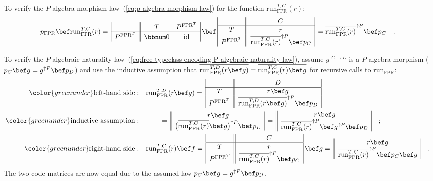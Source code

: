 To verify the $P$-algebra morphism law~(\ref{eq:p-algebra-morphism-law})
for the function $\text{run}_{\text{FPR}}^{T,C}(r)$:
\[
p_{\text{FPR}}\bef\text{run}_{\text{FPR}}^{T,C}(r)=\,\begin{array}{|c||cc|}
 & T & P^{\text{FPR}^{T}}\\
\hline P^{\text{FPR}^{T}} & \bbnum 0 & \text{id}
\end{array}\,\bef\,\begin{array}{|c||c|}
 & C\\
\hline T & r\\
P^{\text{FPR}^{T}} & \overline{\text{run}_{\text{FPR}}^{T,C}(r)}^{\uparrow P}\bef p_{C}
\end{array}\,=\overline{\text{run}_{\text{FPR}}^{T,C}(r)}^{\uparrow P}\bef p_{C}\quad.
\]

To verify the $P$-algebraic naturality law~(\ref{eq:free-typeclass-encoding-P-algebraic-naturality-law}),
assume $g^{:C\rightarrow D}$ is a $P$-algebra morphism ($p_{C}\bef g=g^{\uparrow P}\bef p_{D}$)
and use the inductive assumption that $\overline{\text{run}_{\text{FPR}}^{T,D}(r\bef g)}=\overline{\text{run}_{\text{FPR}}^{T,C}(r)\bef g}$
for recursive calls to $\text{run}_{\text{FPR}}$:
\begin{align*}
{\color{greenunder}\text{left-hand side}:}\quad & \text{run}_{\text{FPR}}^{T,D}(r\bef g)=\,\begin{array}{|c||c|}
 & D\\
\hline T & r\bef g\\
P^{\text{FPR}^{T}} & \overline{\text{run}_{\text{FPR}}^{T,D}(r\bef g)}^{\uparrow P}\bef p_{D}
\end{array}\\
{\color{greenunder}\text{inductive assumption}:}\quad & \quad\quad=\,\begin{array}{||c|}
r\bef g\\
\big(\overline{\text{run}_{\text{FPR}}^{T,C}(r)}\bef g\big)^{\uparrow P}\bef p_{D}
\end{array}\,=\,\begin{array}{||c|}
r\bef g\\
\overline{\text{run}_{\text{FPR}}^{T,C}(r)}^{\uparrow P}\bef g^{\uparrow P}\bef p_{D}
\end{array}\quad;\\
{\color{greenunder}\text{right-hand side}:}\quad & \text{run}_{\text{FPR}}^{T,C}(r)\bef f=\,\begin{array}{|c||c|}
 & C\\
\hline T & r\\
P^{\text{FPR}^{T}} & \overline{\text{run}_{\text{FPR}}^{T,C}(r)}^{\uparrow P}\bef p_{C}
\end{array}\,\bef g=\,\begin{array}{||c|}
r\bef g\\
\overline{\text{run}_{\text{FPR}}^{T,C}(r)}^{\uparrow P}\bef p_{C}\bef g
\end{array}\quad.
\end{align*}
The two code matrices are now equal due to the assumed law $p_{C}\bef g=g^{\uparrow P}\bef p_{D}$.

